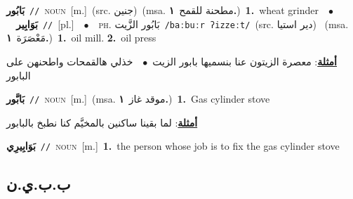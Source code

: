 \documentclass[10pt,a4paper,twoside]{article} %
\begin{document}
\begin{multicols}{2}
{\setlength\topsep{0pt}\textbf{\foreignlanguage{arabic}{بَابُور}}\ {\color{gray}\texttt{//}\color{black}}\ \textsc{noun}\ [m.]\ (src. \color{gray}\foreignlanguage{arabic}{جنين}\color{black})\ \color{gray}(msa. \foreignlanguage{arabic}{مطحنة للقمح}~\foreignlanguage{arabic}{\textbf{١.}})\color{black}\ \textbf{1.}~wheat grinder\ \ $\bullet$\ \ \setlength\topsep{0pt}\textbf{\foreignlanguage{arabic}{بَوَابِير}}\ {\color{gray}\texttt{//}\color{black}}\ [pl.]\ \ $\bullet$\ \ \textsc{ph.} \color{gray} \foreignlanguage{arabic}{بَابُور الزَّيت}\color{black}\ {\color{gray}\texttt{/{\sffamily baːbuːr ʔizzeːt}/}\color{black}}\ \color{gray}(src. \foreignlanguage{arabic}{دير استيا})\color{black}\ \color{gray} (msa. \foreignlanguage{arabic}{مَعْصَرَة}~\foreignlanguage{arabic}{\textbf{١.}})\color{black}\ \textbf{1.}~oil mill.  \textbf{2.}~oil press\  \begin{flushright}\color{gray}\foreignlanguage{arabic}{\textbf{\underline{\foreignlanguage{arabic}{أمثلة}}}: معصرة الزيتون عنا بنسميها بابور الزيت\ $\bullet$\ \  خذلي هالقمحات واطحنهن على البابور}\end{flushright}\color{black}} \vspace{2mm}

{\setlength\topsep{0pt}\textbf{\foreignlanguage{arabic}{بَابَّور}}\ {\color{gray}\texttt{//}\color{black}}\ \textsc{noun}\ [m.]\ \color{gray}(msa. \foreignlanguage{arabic}{موقد غاز}~\foreignlanguage{arabic}{\textbf{١.}})\color{black}\ \textbf{1.}~Gas cylinder stove\  \begin{flushright}\color{gray}\foreignlanguage{arabic}{\textbf{\underline{\foreignlanguage{arabic}{أمثلة}}}: لما بقينا ساكنين بالمخيَّم كنا نطبخ بالبابور}\end{flushright}\color{black}} \vspace{2mm}

{\setlength\topsep{0pt}\textbf{\foreignlanguage{arabic}{بَوَابِيرِي}}\ {\color{gray}\texttt{//}\color{black}}\ \textsc{noun}\ [m.]\ \textbf{1.}~the person whose job is to fix the gas cylinder stove\ } \vspace{2mm}

\vspace{-3mm}
\subsection*{\color{blue}\foreignlanguage{arabic}{ب.ب.ي.ن}\color{blue}{ (ntws)}} 


\end{multicols}
\end{document}
